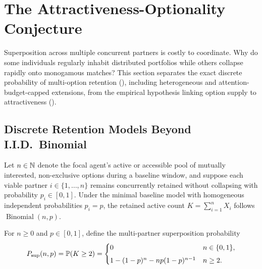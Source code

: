 \section{The Attractiveness-Optionality Conjecture}
\label{sec:conjecture}

Superposition across multiple concurrent partners is costly to coordinate. Why do some
individuals regularly inhabit distributed portfolios while others collapse rapidly onto
monogamous matches? This section separates the exact discrete probability of multi-option
retention (\layermath{}), including heterogeneous and attention-budget-capped extensions,
from the empirical hypothesis linking option supply to attractiveness (\layerempiric{}).

\subsection{Discrete Retention Models Beyond I.I.D.\ Binomial}
\label{subsec:conj-model}

\noindent\layerformal{} Let $n \in \mathbb{N}$ denote the focal agent's active or accessible
pool of mutually interested, non-exclusive options during a baseline window, and suppose
each viable partner $i \in \{1, \dots, n\}$ remains concurrently retained without collapsing
with probability $p_i \in [0, 1]$. Under the minimal baseline model with homogeneous
independent probabilities $p_i = p$, the retained active count $K = \sum_{i=1}^n X_i$ follows
$\operatorname{Binomial}(n, p)$.

\begin{definition}
\label{def:binomial-superposition}
For $n \ge 0$ and $p \in [0, 1]$, define the multi-partner superposition probability
\begin{equation}
  P_{\mathrm{sup}}(n, p) = \mathbb{P}(K \ge 2)
  = \begin{cases}
    0 & n \in \{0, 1\}, \\[4pt]
    1 - (1 - p)^n - n p (1 - p)^{n-1} & n \ge 2.
  \end{cases}
  \label{eq:binomial-superposition}
\end{equation}
\end{definition}

